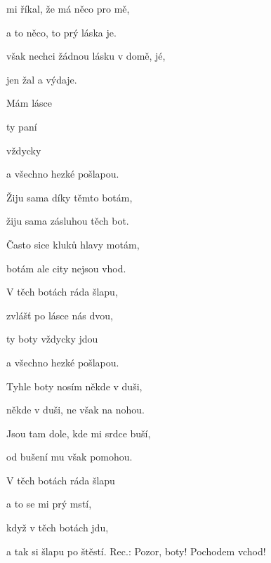 

\zs
{} mi říkal, že má něco pro mě,

a to něco, to prý láska je.

 však nechci žádnou lásku v domě, jé,

 jen žal a výdaje.

Mám  lásce 

ty  paní 

 vždycky 

a všechno hezké pošlapou.
\ks

\zs
Žiju sama díky těmto botám,

žiju sama zásluhou těch bot.

Často sice kluků hlavy motám,

botám ale city nejsou vhod.

V těch botách ráda šlapu,

zvlášť po lásce nás dvou,

ty boty vždycky jdou

a všechno hezké pošlapou.
\ks

\zs
Tyhle boty nosím někde v duši,

někde v duši, ne však na nohou.

Jsou tam dole, kde mi srdce buší,

od bušení mu však pomohou.

V těch botách ráda šlapu

a to se mi prý mstí,

když v těch botách jdu,

a tak si šlapu po štěstí. Rec.: Pozor, boty! Pochodem vchod!
\ks

\kp






















